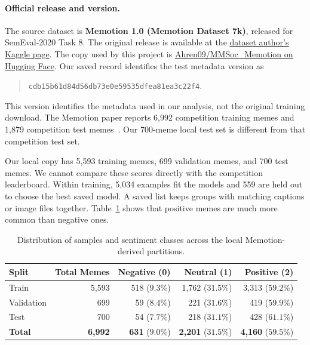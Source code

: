 \documentclass[11pt,a4paper]{article}
\begin{document}
\paragraph{Official release and version.}
The source dataset is \textbf{Memotion 1.0 (Memotion Dataset 7k)}, released for SemEval-2020 Task 8. The original release is available at the \href{https://www.kaggle.com/datasets/williamscott701/memotion-dataset-7k}{dataset author's Kaggle page}. The copy used by this project is \href{https://huggingface.co/datasets/Ahren09/MMSoc_Memotion}{Ahren09/MMSoc\_Memotion on Hugging Face}. Our saved record identifies the test metadata version as
\begin{quote}\small\texttt{cdb15b61d84d56db73e0e59535dfea81ea3c22f4}.\end{quote}
This version identifies the metadata used in our analysis, not the original training download. The Memotion paper reports 6{,}992 competition training memes and 1{,}879 competition test memes~\cite{sharma2020semeval}. Our 700-meme local test set is different from that competition test set.

Our local copy has 5{,}593 training memes, 699 validation memes, and 700 test memes. We cannot compare these scores directly with the competition leaderboard. Within training, 5{,}034 examples fit the models and 559 are held out to choose the best saved model. A saved list keeps groups with matching captions or image files together. Table~\ref{tab:dataset_splits} shows that positive memes are much more common than negative ones.

\begin{table}[t]
\centering
\small
\begin{tabular}{lrrrr}
\toprule
\textbf{Split} & \textbf{Total Memes} & \textbf{Negative (0)} & \textbf{Neutral (1)} & \textbf{Positive (2)} \\
\midrule
Train & 5{,}593 & 518 ($9.3\%$) & 1{,}762 ($31.5\%$) & 3{,}313 ($59.2\%$) \\
Validation & 699 & 59 ($8.4\%$) & 221 ($31.6\%$) & 419 ($59.9\%$) \\
Test & 700 & 54 ($7.7\%$) & 218 ($31.1\%$) & 428 ($61.1\%$) \\
\midrule
\textbf{Total} & \textbf{6{,}992} & \textbf{631} ($9.0\%$) & \textbf{2{,}201} ($31.5\%$) & \textbf{4{,}160} ($59.5\%$) \\
\bottomrule
\end{tabular}
\caption{Distribution of samples and sentiment classes across the local Memotion-derived partitions.}
\label{tab:dataset_splits}
\end{table}
\end{document}
